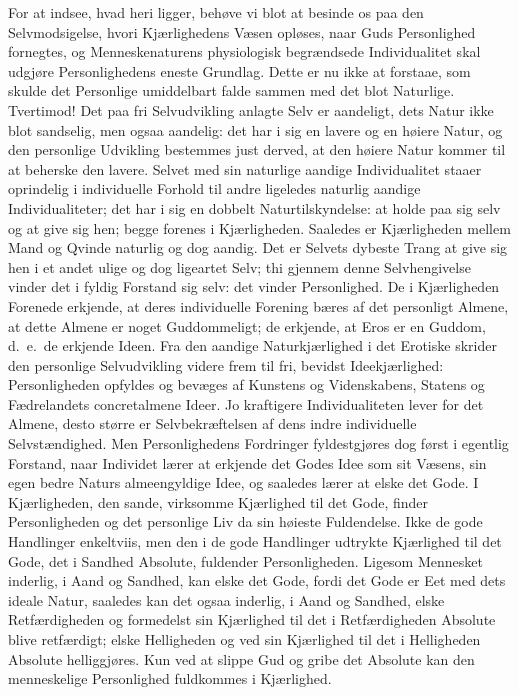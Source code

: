 \documentclass[12pt]{book}
\begin{document}
For at indsee, hvad heri ligger, behøve vi blot at besinde os paa
den Selvmodsigelse, hvori Kjærlighedens Væsen opløses, naar Guds
Personlighed fornegtes, og
Menneskenaturens physiologisk begrændsede Individualitet skal
udgjøre Personlighedens eneste Grundlag. Dette er nu ikke at
forstaae, som skulde det Personlige umiddelbart falde sammen med det
blot Naturlige. Tvertimod! Det paa fri Selvudvikling anlagte Selv er
aandeligt, dets Natur ikke blot sandselig, men ogsaa aandelig: det
har i sig en lavere og en høiere Natur, og den personlige Udvikling
bestemmes just derved, at den høiere Natur kommer til at beherske
den lavere. Selvet med sin naturlige aandige Individualitet staaer
oprindelig i individuelle Forhold til andre ligeledes naturlig
aandige Individualiteter; det har i sig en dobbelt
Naturtilskyndelse: at holde paa sig selv og at give sig hen; begge
forenes i Kjærligheden. Saaledes er Kjærligheden mellem Mand og
Qvinde naturlig og dog aandig. Det er Selvets dybeste Trang at give
sig hen i et andet ulige og dog ligeartet Selv; thi gjennem denne
Selvhengivelse vinder det i fyldig Forstand sig selv: det vinder
Personlighed. De i Kjærligheden Forenede erkjende, at deres
individuelle Forening bæres af det personligt Almene, at dette
Almene er noget Guddommeligt; de erkjende, at Eros er en Guddom,
d.\ e.\ de erkjende Ideen. Fra den aandige Naturkjærlighed i det
Erotiske skrider den personlige Selvudvikling videre frem til fri,
bevidst Ideekjærlighed: Personligheden opfyldes og bevæges af
Kunstens og Videnskabens, Statens og Fædrelandets concretalmene
Ideer. Jo kraftigere Individualiteten lever for det Almene, desto
større er Selvbekræftelsen af dens indre individuelle
Selvstændighed. Men Personlighedens Fordringer fyldestgjøres dog
først i egentlig Forstand, naar Individet lærer at erkjende det
Godes Idee som sit Væsens, sin egen bedre Naturs almeengyldige Idee,
og saaledes lærer at elske det Gode. I Kjærligheden, den sande,
virksomme Kjærlighed til det Gode, finder Personligheden og det
personlige Liv da sin høieste Fuldendelse. Ikke de gode Handlinger
enkeltviis,
men den i de gode Handlinger udtrykte Kjærlighed til det Gode, det i
Sandhed Absolute, fuldender Personligheden. Ligesom Mennesket
inderlig, i Aand og Sandhed, kan elske det Gode, fordi det Gode er
Eet med dets ideale Natur, saaledes kan det ogsaa inderlig, i Aand
og Sandhed, elske Retfærdigheden og formedelst sin Kjærlighed til
det i Retfærdigheden Absolute blive retfærdigt; elske Helligheden og
ved sin Kjærlighed til det i Helligheden Absolute helliggjøres. Kun
ved at slippe Gud og gribe det Absolute kan den menneskelige
Personlighed fuldkommes i Kjærlighed.
\end{document}
